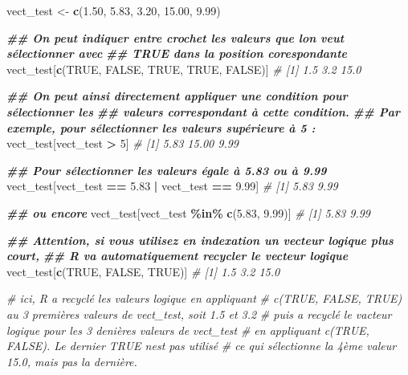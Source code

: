 \documentclass[
]{book}
\newenvironment{Shaded}{\begin{snugshade}}{\end{snugshade}}
\newcommand{\CommentTok}[1]{\textcolor[rgb]{0.56,0.35,0.01}{\textit{#1}}}
\newcommand{\ConstantTok}[1]{\textcolor[rgb]{0.56,0.35,0.01}{#1}}
\newcommand{\DecValTok}[1]{\textcolor[rgb]{0.00,0.00,0.81}{#1}}
\newcommand{\DocumentationTok}[1]{\textcolor[rgb]{0.56,0.35,0.01}{\textbf{\textit{#1}}}}
\newcommand{\FloatTok}[1]{\textcolor[rgb]{0.00,0.00,0.81}{#1}}
\newcommand{\FunctionTok}[1]{\textcolor[rgb]{0.13,0.29,0.53}{\textbf{#1}}}
\newcommand{\NormalTok}[1]{#1}
\newcommand{\OtherTok}[1]{\textcolor[rgb]{0.56,0.35,0.01}{#1}}
\newcommand{\SpecialCharTok}[1]{\textcolor[rgb]{0.81,0.36,0.00}{\textbf{#1}}}
\begin{document}
\begin{Shaded}
\begin{Highlighting}[]
\NormalTok{vect\_test }\OtherTok{\textless{}{-}} \FunctionTok{c}\NormalTok{(}\FloatTok{1.50}\NormalTok{, }\FloatTok{5.83}\NormalTok{, }\FloatTok{3.20}\NormalTok{, }\FloatTok{15.00}\NormalTok{, }\FloatTok{9.99}\NormalTok{)}

\DocumentationTok{\#\# On peut indiquer entre crochet les valeurs que l\textquotesingle{}on veut sélectionner avec }
\DocumentationTok{\#\# TRUE dans la position corespondante}
\NormalTok{vect\_test[}\FunctionTok{c}\NormalTok{(}\ConstantTok{TRUE}\NormalTok{, }\ConstantTok{FALSE}\NormalTok{, }\ConstantTok{TRUE}\NormalTok{, }\ConstantTok{TRUE}\NormalTok{, }\ConstantTok{FALSE}\NormalTok{)]}
\CommentTok{\# [1]  1.5  3.2 15.0}

\DocumentationTok{\#\# On peut ainsi directement appliquer une condition pour sélectionner les }
\DocumentationTok{\#\# valeurs correspondant à cette condition.}
\DocumentationTok{\#\# Par exemple, pour sélectionner les valeurs supérieure à 5 : }
\NormalTok{vect\_test[vect\_test }\SpecialCharTok{\textgreater{}} \DecValTok{5}\NormalTok{]}
\CommentTok{\# [1]  5.83 15.00  9.99}

\DocumentationTok{\#\# Pour sélectionner les valeurs égale à 5.83 ou à 9.99}
\NormalTok{vect\_test[vect\_test }\SpecialCharTok{==} \FloatTok{5.83} \SpecialCharTok{|}\NormalTok{ vect\_test }\SpecialCharTok{==} \FloatTok{9.99}\NormalTok{]}
\CommentTok{\# [1] 5.83 9.99}

\DocumentationTok{\#\# ou encore}
\NormalTok{vect\_test[vect\_test }\SpecialCharTok{\%in\%} \FunctionTok{c}\NormalTok{(}\FloatTok{5.83}\NormalTok{, }\FloatTok{9.99}\NormalTok{)]}
\CommentTok{\# [1] 5.83 9.99}

\DocumentationTok{\#\# Attention, si vous utilisez en indexation un vecteur logique plus court,}
\DocumentationTok{\#\# R va automatiquement recycler le vecteur logique}
\NormalTok{vect\_test[}\FunctionTok{c}\NormalTok{(}\ConstantTok{TRUE}\NormalTok{, }\ConstantTok{FALSE}\NormalTok{, }\ConstantTok{TRUE}\NormalTok{)]}
\CommentTok{\# [1]  1.5  3.2 15.0}

\CommentTok{\# ici, R a recyclé les valeurs logique en appliquant }
\CommentTok{\# c(TRUE, FALSE, TRUE) au 3 premières valeurs de vect\_test, soit 1.5 et 3.2}
\CommentTok{\# puis a recyclé le vacteur logique pour les 3 denières valeurs de vect\_test}
\CommentTok{\# en appliquant c(TRUE, FALSE). Le dernier TRUE n\textquotesingle{}est pas utilisé}
\CommentTok{\# ce qui sélectionne la 4ème valeur 15.0, mais pas la dernière.}
\end{Highlighting}
\end{Shaded}
\end{document}
